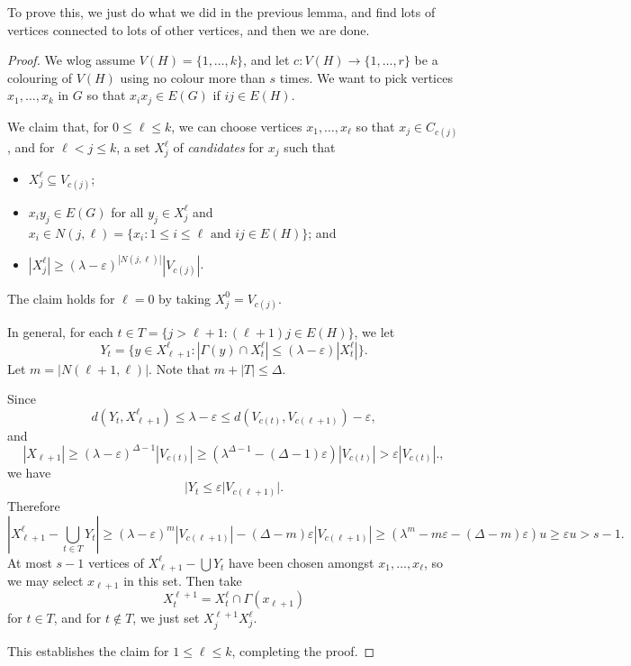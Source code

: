 \documentclass[a4paper]{article}
\begin{document}
To prove this, we just do what we did in the previous lemma, and find lots of vertices connected to lots of other vertices, and then we are done.
\begin{proof}
  We wlog assume $V(H) = \{1, \ldots, k\}$, and let $c: V(H) \to \{1, \ldots, r\}$ be a colouring of $V(H)$ using no colour more than $s$ times. We want to pick vertices $x_1, \ldots, x_k$ in $G$ so that $x_i x_j \in E(G)$ if $ij \in E(H)$.

  We claim that, for $0 \leq \ell \leq k$, we can choose vertices $x_1, \ldots, x_\ell$ so that $x_j \in C_{c(j)}$, and for $\ell < j \leq k$, a set $X^{\ell}_j$ of \emph{candidates} for $x_j$ such that
  \begin{itemize}
    \item $X_j^{\ell} \subseteq V_{c(j)}$;
    \item $x_i y_j \in E(G)$ for all $y_j \in X_j^{\ell}$ and $x_i \in N(j, \ell) = \{x_i: 1 \leq i \leq \ell \text{ and }ij \in E(H)\}$; and
    \item $|X_j^{\ell}| \geq (\lambda - \varepsilon)^{|N(j, \ell)|} |V_{c(j)}|$.
  \end{itemize}
  The claim holds for $\ell = 0$ by taking $X_j^0 = V_{c(j)}$.

  In general, for each $t \in T = \{j > \ell + 1 : (\ell + 1)j \in E(H)\}$, we let
  \[
    Y_t = \{y \in X_{\ell + 1}^{\ell} : |\Gamma(y) \cap X_t^\ell| \leq (\lambda - \varepsilon) |X^{\ell}_t|\}.
  \]
  Let $m = |N(\ell + 1, \ell)|$. Note that $m + |T| \leq \Delta$.

  Since
  \[
    d(Y_t, X_{\ell + 1}^\ell) \leq \lambda - \varepsilon \leq d(V_{c(t)}, V_{c(\ell + 1)}) - \varepsilon,
  \]
  and
  \[
    |X_{\ell + 1}| \geq (\lambda - \varepsilon)^{\Delta - 1} |V_{c(t)}| \geq (\lambda^{\Delta - 1} - (\Delta - 1)\varepsilon) |V_{c(t)}| > \varepsilon |V_{c(t)}|.,
  \]
  we have
  \[
    |Y_t \leq \varepsilon |V_{c(\ell + 1)}|.
  \]
  Therefore
  \[
    \left|X_{\ell + 1}^{\ell} - \bigcup_{t \in T} Y_t \right| \geq (\lambda - \varepsilon)^m |V_{c(\ell + 1)}| - (\Delta - m) \varepsilon|V_{c(\ell + 1)}| \geq (\lambda^m - m\varepsilon - (\Delta - m)\varepsilon) u \geq \varepsilon u > s - 1.
  \]
  At most $s - 1$ vertices of $X_{\ell + 1}^\ell - \bigcup Y_t$ have been chosen amongst $x_1, \ldots, x_\ell$, so we may select $x_{\ell + 1}$ in this set. Then take
  \[
    X^{\ell + 1}_t = X^\ell_t \cap \Gamma(x_{\ell + 1})
  \]
  for $t \in T$, and for $t \not \in T$, we just set $X_j^{\ell + 1} X_j^{\ell}$.

  This establishes the claim for $1 \leq \ell \leq k$, completing the proof.
\end{proof}
\end{document}
